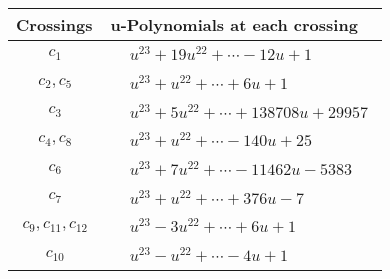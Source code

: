 \documentclass[1p]{elsarticle_modified}
\theoremstyle{definition}
\begin{document}
\begin{tabular}{m{50pt}|m{274pt}}
Crossings & \hspace{64pt}u-Polynomials at each crossing \\
\hline $$\begin{aligned}c_{1}\end{aligned}$$&$\begin{aligned}
&u^{23}+19 u^{22}+\cdots-12 u+1
\end{aligned}$\\
\hline $$\begin{aligned}c_{2},c_{5}\end{aligned}$$&$\begin{aligned}
&u^{23}+u^{22}+\cdots+6 u+1
\end{aligned}$\\
\hline $$\begin{aligned}c_{3}\end{aligned}$$&$\begin{aligned}
&u^{23}+5 u^{22}+\cdots+138708 u+29957
\end{aligned}$\\
\hline $$\begin{aligned}c_{4},c_{8}\end{aligned}$$&$\begin{aligned}
&u^{23}+u^{22}+\cdots-140 u+25
\end{aligned}$\\
\hline $$\begin{aligned}c_{6}\end{aligned}$$&$\begin{aligned}
&u^{23}+7 u^{22}+\cdots-11462 u-5383
\end{aligned}$\\
\hline $$\begin{aligned}c_{7}\end{aligned}$$&$\begin{aligned}
&u^{23}+u^{22}+\cdots+376 u-7
\end{aligned}$\\
\hline $$\begin{aligned}c_{9},c_{11},c_{12}\end{aligned}$$&$\begin{aligned}
&u^{23}-3 u^{22}+\cdots+6 u+1
\end{aligned}$\\
\hline $$\begin{aligned}c_{10}\end{aligned}$$&$\begin{aligned}
&u^{23}- u^{22}+\cdots-4 u+1
\end{aligned}$\\
\hline
\end{tabular}\\~\\
\end{document}
